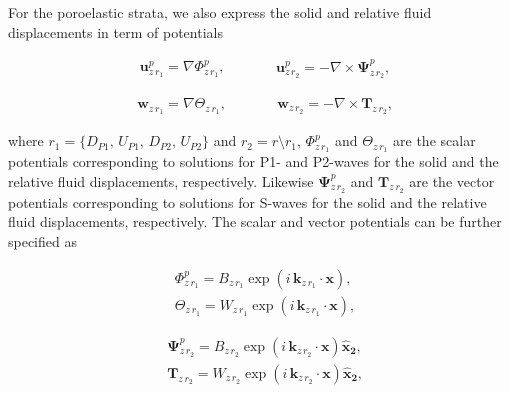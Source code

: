 \documentclass[draft]{agujournal2019}
\begin{document}
For the poroelastic strata, we also express the solid and relative fluid displacements in term of potentials
\begin{linenomath*}
\begin{equation}\label{Eq.a12}
\begin{aligned}
& \bm{u}_{z\,r_1}^p = \nabla \Phi^p_{z\,r_1},
\end{aligned}
\qquad
\begin{aligned}
& \bm{u}_{z\,r_2}^p = - \nabla \times \bm{\Psi}^p_{z\,r_2},
\end{aligned}
\end{equation}
\end{linenomath*}
\begin{linenomath*}
\begin{equation}\label{Eq.a13}
\begin{aligned}
& \bm{w}_{z\,r_1} = \nabla \Theta_{z\,r_1},
\end{aligned}
\qquad
\begin{aligned}
& \bm{w}_{z\,r_2} = -  \nabla \times \bm{T}_{z\,r_2},
\end{aligned}
\end{equation}
\end{linenomath*}
where  $r_1 = \{D_{P1},\,U_{P1},\,D_{P2},\,U_{P2}\}$ and $r_2=r\setminus r_1$, 
$\Phi^p_{z\,r_1}$ and $\Theta_{z\,r_1}$ are the scalar potentials corresponding to solutions for P1- and P2-waves for the solid and the relative fluid displacements, respectively. Likewise $\bm{\Psi}^p_{z\,r_2}$ and $ \bm{T}_{z\,r_2}$ are the vector potentials corresponding to solutions for S-waves for the solid and the relative fluid displacements, respectively. The scalar and vector potentials can be further specified as
\begin{linenomath*}
\begin{equation}\label{Eq.a14}
\begin{split}
&  \Phi^p_{z\,r_1} = B_{z\,r_1} \exp \left( i\, \bm{k}_{z\, r_1}\cdot \bm{x} \right), \\
& \Theta_{z\,r_1} =  W_{z\,r_1} \exp \left( i\, \bm{k}_{z\, r_1} \cdot \bm{x} \right), 
\end{split}
\end{equation}
\end{linenomath*}
\begin{linenomath*}
\begin{equation}\label{Eq.a15}
\begin{split}
& \bm{ \Psi}^p_{z\,r_2} = B_{z\,r_2} \exp \left( i\, \bm{k}_{z\, r_2}\cdot \bm{x} \right) \bm{\hat {x}_2}, \\
& \bm{T}_{z\,r_2} =  W_{z\,r_2} \exp \left( i\, \bm{k}_{z\, r_2} \cdot \bm{x} \right) \bm{\hat {x}_2}, 
\end{split}
\end{equation}
\end{linenomath*}
\end{document}
